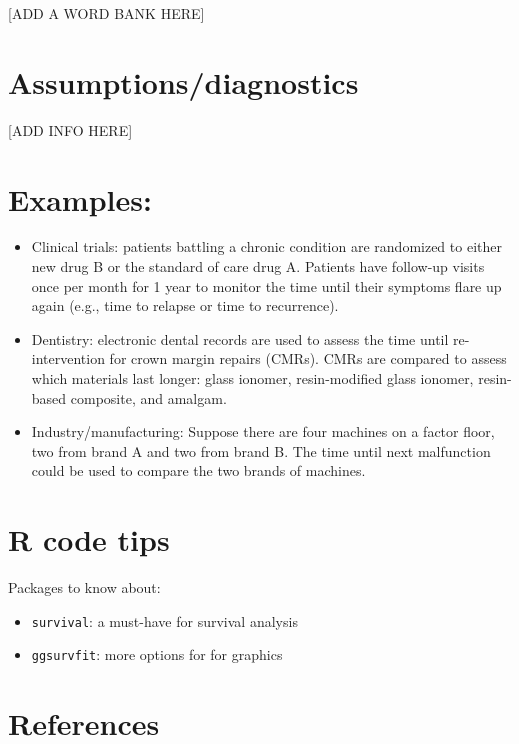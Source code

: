 \documentclass[
]{book}
\providecommand{\tightlist}{%
  \setlength{\itemsep}{0pt}\setlength{\parskip}{0pt}}
\begin{document}
{[}ADD A WORD BANK HERE{]}

\hypertarget{assumptionsdiagnostics-2}{%
\section{Assumptions/diagnostics}\label{assumptionsdiagnostics-2}}

{[}ADD INFO HERE{]}

\hypertarget{examples-2}{%
\section{Examples:}\label{examples-2}}

\begin{itemize}
\item
  Clinical trials: patients battling a chronic condition are randomized to either new drug B or the standard of care drug A. Patients have follow-up visits once per month for 1 year to monitor the time until their symptoms flare up again (e.g., time to relapse or time to recurrence).
\item
  Dentistry: electronic dental records are used to assess the time until re-intervention for crown margin repairs (CMRs). CMRs are compared to assess which materials last longer: glass ionomer, resin-modified glass ionomer, resin-based composite, and amalgam.
\item
  Industry/manufacturing: Suppose there are four machines on a factor floor, two from brand A and two from brand B. The time until next malfunction could be used to compare the two brands of machines.
\end{itemize}

\hypertarget{r-code-tips-2}{%
\section{R code tips}\label{r-code-tips-2}}

Packages to know about:

\begin{itemize}
\tightlist
\item
  \texttt{survival}: a must-have for survival analysis
\item
  \texttt{ggsurvfit}: more options for for graphics
\end{itemize}

\hypertarget{references}{%
\section{References}\label{references}}
\end{document}
